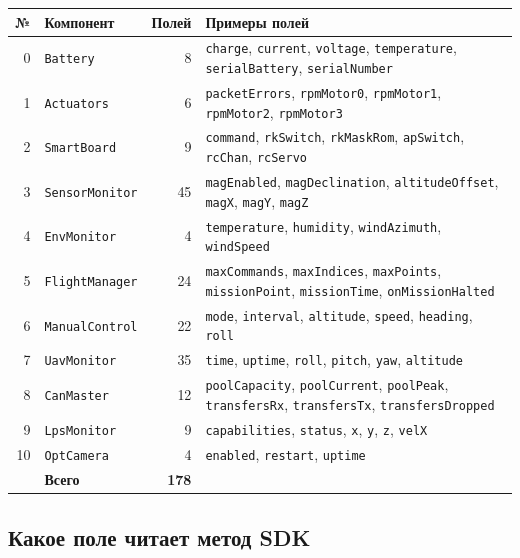 \begin{center}
\small
\begin{tabularx}{\linewidth}{@{}r l r X@{}}
\toprule
\textbf{№} & \textbf{Компонент} & \textbf{Полей} & \textbf{Примеры полей} \\
\midrule
0 & \texttt{Battery} & 8 & \texttt{charge}, \texttt{current}, \texttt{voltage}, \texttt{temperature}, \texttt{serialBattery}, \texttt{serialNumber} \\
1 & \texttt{Actuators} & 6 & \texttt{packetErrors}, \texttt{rpmMotor0}, \texttt{rpmMotor1}, \texttt{rpmMotor2}, \texttt{rpmMotor3} \\
2 & \texttt{SmartBoard} & 9 & \texttt{command}, \texttt{rkSwitch}, \texttt{rkMaskRom}, \texttt{apSwitch}, \texttt{rcChan}, \texttt{rcServo} \\
3 & \texttt{SensorMonitor} & 45 & \texttt{magEnabled}, \texttt{magDeclination}, \texttt{altitudeOffset}, \texttt{magX}, \texttt{magY}, \texttt{magZ} \\
4 & \texttt{EnvMonitor} & 4 & \texttt{temperature}, \texttt{humidity}, \texttt{windAzimuth}, \texttt{windSpeed} \\
5 & \texttt{FlightManager} & 24 & \texttt{maxCommands}, \texttt{maxIndices}, \texttt{maxPoints}, \texttt{missionPoint}, \texttt{missionTime}, \texttt{onMissionHalted} \\
6 & \texttt{ManualControl} & 22 & \texttt{mode}, \texttt{interval}, \texttt{altitude}, \texttt{speed}, \texttt{heading}, \texttt{roll} \\
7 & \texttt{UavMonitor} & 35 & \texttt{time}, \texttt{uptime}, \texttt{roll}, \texttt{pitch}, \texttt{yaw}, \texttt{altitude} \\
8 & \texttt{CanMaster} & 12 & \texttt{poolCapacity}, \texttt{poolCurrent}, \texttt{poolPeak}, \texttt{transfersRx}, \texttt{transfersTx}, \texttt{transfersDropped} \\
9 & \texttt{LpsMonitor} & 9 & \texttt{capabilities}, \texttt{status}, \texttt{x}, \texttt{y}, \texttt{z}, \texttt{velX} \\
10 & \texttt{OptCamera} & 4 & \texttt{enabled}, \texttt{restart}, \texttt{uptime} \\
\midrule
 & \textbf{Всего} & \textbf{178} & \\
\bottomrule
\end{tabularx}
\end{center}

\subsection*{Какое поле читает метод SDK}

